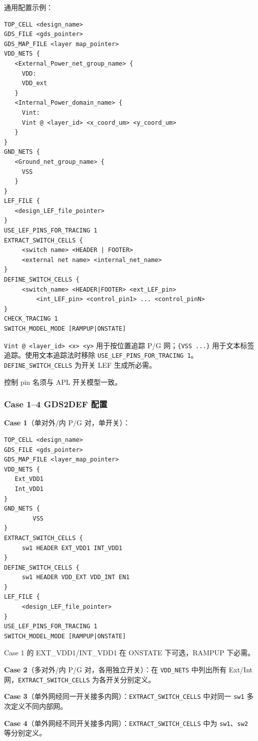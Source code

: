 通用配置示例：
\begin{lstlisting}
TOP_CELL <design_name>
GDS_FILE <gds_pointer>
GDS_MAP_FILE <layer map_pointer>
VDD_NETS {
   <External_Power_net_group_name> {
     VDD:
     VDD_ext
   }
   <Internal_Power_domain_name> {
     Vint:
     Vint @ <layer_id> <x_coord_um> <y_coord_um>
   }
}
GND_NETS {
   <Ground_net_group_name> {
     VSS
   }
}
LEF_FILE {
   <design_LEF_file_pointer>
}
USE_LEF_PINS_FOR_TRACING 1
EXTRACT_SWITCH_CELLS {
     <switch name> <HEADER | FOOTER>
     <external net name> <internal_net_name>
}
DEFINE_SWITCH_CELLS {
     <switch_name> <HEADER|FOOTER> <ext_LEF_pin>
         <int_LEF_pin> <control_pin1> ... <control_pinN>
}
CHECK_TRACING 1
SWITCH_MODEL_MODE [RAMPUP|ONSTATE]
\end{lstlisting}

\texttt{Vint @ <layer\_id> <x> <y>} 用于按位置追踪 P/G 网；\texttt{\{VSS ...\}} 用于文本标签追踪。使用文本追踪法时移除 \texttt{USE\_LEF\_PINS\_FOR\_TRACING 1}。\texttt{DEFINE\_SWITCH\_CELLS} 为开关 LEF 生成所必需。

\begin{noteBox}
控制 pin 名须与 APL 开关模型一致。
\end{noteBox}

\subsubsection{Case 1--4 GDS2DEF 配置}
\textbf{Case 1}（单对外/内 P/G 对，单开关）：
\begin{lstlisting}
TOP_CELL <design_name>
GDS_FILE <gds_pointer>
GDS_MAP_FILE <layer_map_pointer>
VDD_NETS {
   Ext_VDD1
   Int_VDD1
}
GND_NETS {
        VSS
}
EXTRACT_SWITCH_CELLS {
     sw1 HEADER EXT_VDD1 INT_VDD1
}
DEFINE_SWITCH_CELLS {
     sw1 HEADER VDD_EXT VDD_INT EN1
}
LEF_FILE {
     <design_LEF_file_pointer>
}
USE_LEF_PINS_FOR_TRACING 1
SWITCH_MODEL_MODE [RAMPUP|ONSTATE]
\end{lstlisting}
Case 1 的 EXT\_VDD1/INT\_VDD1 在 ONSTATE 下可选，RAMPUP 下必需。

\textbf{Case 2}（多对外/内 P/G 对，各用独立开关）：在 \texttt{VDD\_NETS} 中列出所有 Ext/Int 网，\texttt{EXTRACT\_SWITCH\_CELLS} 为各开关分别定义。

\textbf{Case 3}（单外网经同一开关接多内网）：\texttt{EXTRACT\_SWITCH\_CELLS} 中对同一 \texttt{sw1} 多次定义不同内部网。

\textbf{Case 4}（单外网经不同开关接多内网）：\texttt{EXTRACT\_SWITCH\_CELLS} 中为 \texttt{sw1}、\texttt{sw2} 等分别定义。

